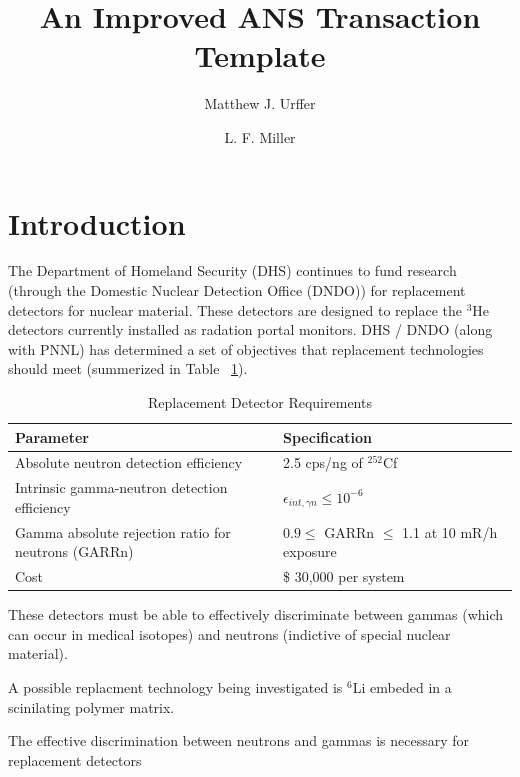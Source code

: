 \documentclass{anstrans}
\title{An Improved ANS Transaction Template}
\author{Matthew J. Urffer \and L. F. Miller}
\institute{
Department of Nuclear Engineering, University of Tennessee, Knoxville, TN, 37916
}
\newcommand{\iso}[2]{${}^{#2}${#1}}
\begin{document}
\section{Introduction}
The Department of Homeland Security (DHS) continues to fund research (through the Domestic Nuclear Detection Office (DNDO)) for replacement detectors for nuclear material.
These detectors are designed to replace the \iso{He}{3} detectors currently installed as radation portal monitors.
DHS / DNDO (along with PNNL) has determined a set of objectives that replacement technologies should meet (summerized in Table ~\ref{tab:DHSCriteria}).
\begin{table}[h]
    \caption{Replacement Detector Requirements  }
	\centering
	\begin{tabular}{p{} | p{} }
	Parameter & Specification \\
	\hline
	\hline
	Absolute neutron detection efficiency & 2.5 cps/ng of ${}^{252}$Cf \\
	Intrinsic gamma-neutron detection efficiency & $ \epsilon_{int,\gamma n}\leq 10^{-6}$ \\
	Gamma absolute rejection ratio for neutrons (GARRn) & $ 0.9 \leq \text{ GARRn }\leq$ 1.1 at 10 mR/h exposure \\
	Cost &  \$ 30,000 per system \\
	\hline
	\end{tabular}
    \label{tab:DHSCriteria}
\end{table}
These detectors must be able to effectively discriminate between gammas (which can occur in medical isotopes) and neutrons (indictive of special nuclear material).

A possible replacment technology being investigated is \iso{Li}{6} embeded in a scinilating polymer matrix.

The effective discrimination between neutrons and gammas is necessary for replacement detectors 
\end{document}

